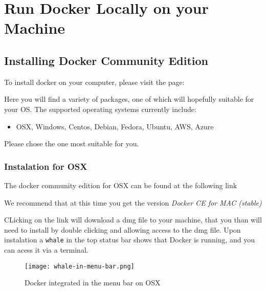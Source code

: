 \chapter{Run Docker Locally on your Machine}\label{S:docker-local}

\FILENAME

\section{Installing Docker Community Edition}\label{installing-docker-community-edition}

To install docker on your computer, please visit the page:


Here you will find a variety of packages, one of which will hopefully
suitable for your OS. The supported operating systems currently include:

\begin{itemize}
\item  OSX, Windows, Centos, Debian, Fedora, Ubuntu, AWS, Azure
\end{itemize}

Please chose the one most suitable for you.

\subsection{Instalation for OSX}\label{instalation-for-osx}

The docker community edition for OSX can be found at the following link


We recommend that at this time you get the version {\em Docker CE for MAC (stable)}


CLicking on the link will download a dmg file to your machine, that
you than will need to install by double clicking and allowing access
to the dmg file. Upon instalation a \texttt{whale} in the top status
bar shows that Docker is running, and you can acess it via a terminal.

\begin{figure}[htb]
\centering
\texttt{[image: whale-in-menu-bar.png]}
\caption{Docker integrated in the menu bar on OSX}
\end{figure}

